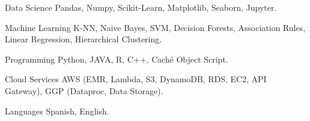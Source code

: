 

\begin{cvskills}

  \cvskill
    {Data Science} %
    {Pandas, Numpy, Scikit-Learn, Matplotlib, Seaborn, Jupyter.} %

  \cvskill
    {Machine Learning} %
    {K-NN, Naive Bayes, SVM, Decision Forests, Association Rules, Linear Regression, Hierarchical Clustering.} %

  \cvskill
    {Programming} %
    {Python, JAVA, R, C++, Caché Object Script.} %

  \cvskill
    {Cloud Services} %
    {AWS (EMR, Lambda, S3, DynamoDB, RDS, EC2, API Gateway), GGP (Dataproc, Data Storage).} %

  \cvskill
    {Languages} %
    {Spanish, English.} %
\end{cvskills}